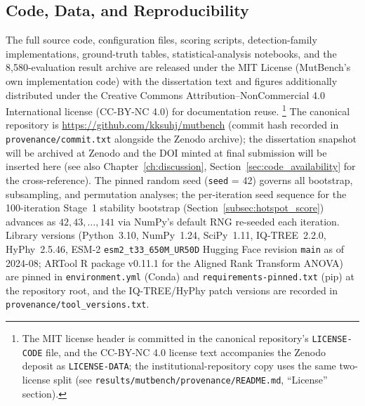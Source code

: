 \subsection{Code, Data, and Reproducibility}
\label{subsec:code_data_availability}
The full source code, configuration files, scoring scripts, detection-family implementations, ground-truth tables, statistical-analysis notebooks, and the 8{,}580-evaluation result archive are released under the MIT License (MutBench's own implementation code) with the dissertation text and figures additionally distributed under the Creative Commons Attribution--NonCommercial 4.0 International license (CC-BY-NC 4.0) for documentation reuse.%
\footnote{The MIT license header is committed in the canonical repository's \texttt{LICENSE-CODE} file, and the CC-BY-NC 4.0 license text accompanies the Zenodo deposit as \texttt{LICENSE-DATA}; the institutional-repository copy uses the same two-license split (see \texttt{results/mutbench/provenance/README.md}, ``License'' section).}
The canonical repository is \url{https://github.com/kksuhj/mutbench} (commit hash recorded in \texttt{provenance/commit.txt} alongside the Zenodo archive); the dissertation snapshot will be archived at Zenodo and the DOI minted at final submission will be inserted here (see also Chapter~\ref{ch:discussion}, Section~\ref{sec:code_availability} for the cross-reference). The pinned random seed (\texttt{seed} = 42) governs all bootstrap, subsampling, and permutation analyses; the per-iteration seed sequence for the 100-iteration Stage~1 stability bootstrap (Section~\ref{subsec:hotspot_score}) advances as $42, 43, \ldots, 141$ via NumPy's default RNG re-seeded each iteration. Library versions (Python~3.10, NumPy~1.24, SciPy~1.11, IQ-TREE~2.2.0, HyPhy~2.5.46, ESM-2 \texttt{esm2\_t33\_650M\_UR50D} Hugging Face revision \texttt{main} as of 2024-08; ARTool R package v0.11.1 for the Aligned Rank Transform ANOVA) are pinned in \texttt{environment.yml} (Conda) and \texttt{requirements-pinned.txt} (pip) at the repository root, and the IQ-TREE/HyPhy patch versions are recorded in \texttt{provenance/tool\_versions.txt}.

